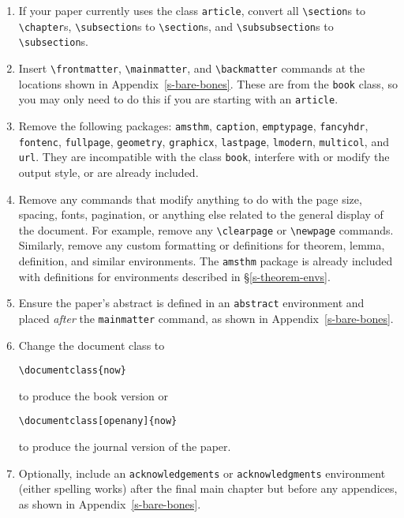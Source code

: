 \documentclass[openany]{now} %
\begin{document}
\begin{enumerate}
\item If your paper currently uses the class \texttt{article}, 
convert all \texttt{\textbackslash section}s to \texttt{\textbackslash chapter}s, 
\texttt{\textbackslash subsection}s to
\texttt{\textbackslash section}s, and \texttt{\textbackslash subsubsection}s 
to \texttt{\textbackslash subsection}s.

\item Insert \texttt{\textbackslash frontmatter}, \texttt{\textbackslash mainmatter},
and \texttt{\textbackslash backmatter} commands at the locations shown in
Appendix~\ref{s-bare-bones}. These are from the \texttt{book} class, so
you may only need to do this if you are starting with an \texttt{article}.

\item Remove the following packages:
\texttt{amsthm},
\texttt{caption},
\texttt{emptypage},
\texttt{fancyhdr},
\texttt{fontenc},
\texttt{fullpage},
\texttt{geometry},
\texttt{graphicx},
\texttt{lastpage},
\texttt{lmodern},
\texttt{multicol}, and
\texttt{url}.
They are incompatible with the class \texttt{book}, interfere with 
or modify the output style, or are already included.

\item Remove any commands that modify anything to do with the page size,
spacing, fonts, pagination, or anything else related to the general display of
the document. For example, remove any \texttt{\textbackslash clearpage} or
\texttt{\textbackslash newpage} commands. Similarly, remove any custom
formatting or definitions for theorem, lemma, definition, and similar
environments. The \texttt{amsthm} package is already included with definitions
for environments described in \S\ref{s-theorem-envs}.

\item Ensure the paper's abstract is defined in an \texttt{abstract}
environment and placed \emph{after} the \texttt{mainmatter} command, as shown
in Appendix~\ref{s-bare-bones}.

\item Change the document class to

\texttt{\textbackslash documentclass\{now\}}

to produce the book version or 

\texttt{\textbackslash documentclass[openany]\{now\}}

to produce the journal version of the paper.

\item Optionally, include an \texttt{acknowledgements} or \texttt{acknowledgments}
environment (either spelling works) after the final main chapter but before any
appendices, as shown in Appendix~\ref{s-bare-bones}.


\end{enumerate}
\end{document}

